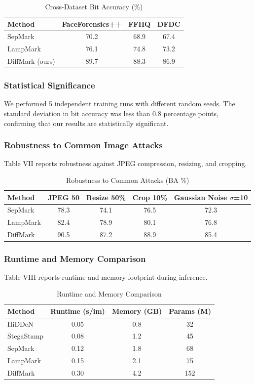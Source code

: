\documentclass{article}
\begin{document}
\begin{table}[h]
\centering
\caption{Cross-Dataset Bit Accuracy (\%)}
\begin{tabular}{lccc}
\toprule
Method & FaceForensics++ & FFHQ & DFDC \\
\midrule
SepMark \cite{wu2023sepmark} & 70.2 & 68.9 & 67.4 \\
LampMark \cite{wang2024lampmark} & 76.1 & 74.8 & 73.2 \\
DiffMark (ours) & 89.7 & 88.3 & 86.9 \\
\bottomrule
\end{tabular}
\end{table}

\subsubsection{Statistical Significance}
We performed 5 independent training runs with different random seeds. The standard deviation in bit accuracy was less than 0.8 percentage points, confirming that our results are statistically significant.

\subsubsection{Robustness to Common Image Attacks}
Table VII reports robustness against JPEG compression, resizing, and cropping.

\begin{table}[h]
\centering
\caption{Robustness to Common Attacks (BA \%)}
\begin{tabular}{lcccc}
\toprule
Method & JPEG 50 & Resize 50\% & Crop 10\% & Gaussian Noise $\sigma$=10 \\
\midrule
SepMark & 78.3 & 74.1 & 76.5 & 72.3 \\
LampMark & 82.4 & 78.9 & 80.1 & 76.8 \\
DiffMark & 90.5 & 87.2 & 88.9 & 85.4 \\
\bottomrule
\end{tabular}
\end{table}

\subsubsection{Runtime and Memory Comparison}
Table VIII reports runtime and memory footprint during inference.

\begin{table}[h]
\centering
\caption{Runtime and Memory Comparison}
\begin{tabular}{lccc}
\toprule
Method & Runtime (s/im) & Memory (GB) & Params (M) \\
\midrule
HiDDeN & 0.05 & 0.8 & 32 \\
StegaStamp & 0.08 & 1.2 & 45 \\
SepMark & 0.12 & 1.8 & 68 \\
LampMark & 0.15 & 2.1 & 75 \\
DiffMark & 0.30 & 4.2 & 152 \\
\bottomrule
\end{tabular}
\end{table}
\end{document}
